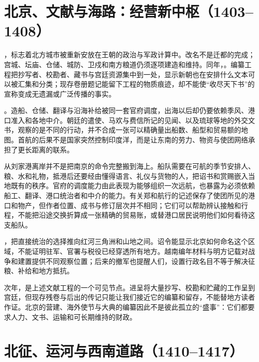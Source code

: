 \section{北京、文献与海路：经营新中枢（1403--1408）}

，标志着北方城市被重新安放在王朝的政治与军政计算中。改名不是迁都的完成；宫城、坛庙、仓储、城防、卫戍和南方粮道仍须逐项建造和维持。同年，。编纂工程把抄写者、校勘者、藏书与宫廷资源集中到一处，显示新朝也在安排什么文本可以被汇集和分类；现存卷册题记能留下工程的物质痕迹，却不能使“收尽天下书”的宣称变成无遗漏或广泛传播的事实。

。造船、仓储、翻译与沿海补给被同一套官府调度，出海以后却仍要依赖季风、港口准入和各地中介。朝廷的遣使、马欢与费信所记的见闻、以及琉球等地的外交文书，观察的是不同的行动，并不合成一张可以精确量出船数、船型和贸易额的地图。首航的后果不是国家突然控制印度洋，而是让东南的劳力、物资与使团网络承担了更长距离的联系。

从刘家港离岸并不是把南京的命令完整搬到海上。船队需要在可航的季节安排人、粮、水和礼物，抵港后还要经由懂得语言、礼仪与货物的人，把诏书和赏赐嵌入当地既有的秩序。官府的调度能力由此表现为能够组织一次远航，也暴露为必须依赖船工、翻译、港口统治者和中介的能力。有关郑和航行的记述保存了使团所见的港口和物产，但作者位置、成书与修订层次并不相同；它们可以帮助辨认接触和行程，不能把沿途交换折算成一张精确的贸易账，或替港口居民说明他们如何看待这支船队。

，把直接统治的选择推向红河三角洲和山地之间。诏令能显示北京如何命名这个区域，不能证明驻军、官署与税役已经穿透所有地方。越南编年材料与明方记载对战争和建置提供不同观察位置；后来的撤军也提醒人们，设置行政名目不等于解决征粮、补给和地方抵抗。

次年，是上述文献工程的一个可见节点。进呈将大量抄写、校勘和贮藏的工作呈到宫廷，但现存残卷与后出的传记只能让我们接近它的编纂和留存，不能替地方读者作证。北京的营建、海外使节与大典的编纂因此不是彼此孤立的“盛事”：它们都要求人力、文书、运输和可长期维持的财政。

\section{北征、运河与西南道路（1410--1417）}

